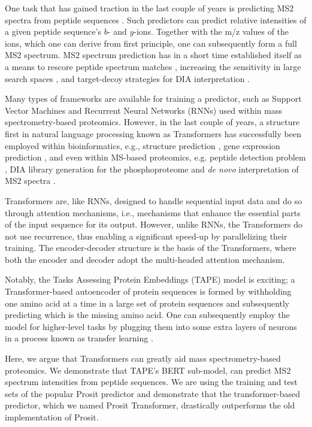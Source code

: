 \documentclass[10pt,a4paper]{article}
\begin{document}
One task that has gained traction in the last couple of years is predicting MS2 spectra from peptide sequences \cite{Degroeve2015-fh,Gessulat2019-el}. Such predictors can predict relative intensities of a given peptide sequence's $b$- and $y$-ions. Together with the m/z values of the ions, which one can derive from first principle, one can subsequently form a full MS2 spectrum. MS2 spectrum prediction has in a short time established itself as a means to rescore peptide spectrum matches \cite{C_Silva2019-ja}, increasing the sensitivity in large search spaces \cite{Wilhelm2021-mz}, and target-decoy strategies for DIA interpretation \cite{Searle2020-yk}.

Many types of frameworks are available for training a predictor, such as Support Vector Machines and Recurrent Neural Networks (RNNs) used within mass spectrometry-based proteomics. However, in the last couple of years, a structure first in natural language processing \cite{devlin2018bert} known as Transformers \cite{Vaswani2017-sy} has successfully been employed within bioinformatics, e.g., structure prediction \cite{Rao2019-qq,Bepler2021-ci}, gene expression prediction \cite{avsec2021effective}, and even within MS-based proteomics, e.g. peptide detection problem \cite{cheng2021pepformer}, DIA library generation for the phosphoproteome \cite{lou2021deepphospho} and {\em de novo} interpretation of MS2 spectra \cite{yilmaz2022novo}.

Transformers are, like RNNs, designed to handle sequential input data and do so through attention mechanisms, i.e., mechanisms that enhance the essential parts of the input sequence for its output. However, unlike RNNs, the Transformers do not use recurrence, thus enabling a significant speed-up by parallelizing their training. The encoder-decoder structure is the basis of the Transformers, where both the encoder and decoder adopt the multi-headed attention mechanism\cite{Vaswani2017-sy}.

Notably, the Tasks Assessing Protein Embeddings (TAPE) model \cite{Rao2019-qq} is exciting; a Transformer-based autoencoder of protein sequences is formed by withholding one amino acid at a time in a large set of protein sequences and subsequently predicting which is the missing amino acid. One can subsequently employ the model for higher-level tasks by plugging them into some extra layers of neurons in a process known as transfer learning \cite{Rao2019-qq,Bepler2021-ci}.

Here, we argue that Transformers can greatly aid mass spectrometry-based proteomics. We demonstrate that TAPE’s BERT sub-model, can predict MS2 spectrum intensities from peptide sequences. We are using the training and test sets of the popular Prosit \cite{Gessulat2019-el} predictor and demonstrate that the transformer-based predictor, which we named Prosit Transformer, drastically outperforms the old implementation of Prosit.
\end{document}
